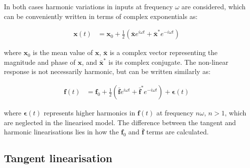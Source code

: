 \documentclass[preprint]{elsarticle}
\begin{document}
In both cases harmonic variations in inputs at frequency $\omega{}$ are considered,
which can be conveniently written in terms of complex exponentials as:
\begin{linenomath}\begin{align}
  \label{eq:139}
  \boldsymbol{x}(t) &= \boldsymbol{x}_0 + \frac{1}{2} \left( \bar{\boldsymbol{x}} e^{i\omega{}t} + \bar{\boldsymbol{x}}^* e^{-i\omega{}t} \right)
\end{align}\end{linenomath}
where $\boldsymbol{x}_0$ is the mean value of $\boldsymbol{x}$, $\bar{\boldsymbol{x}}$ is a complex vector representing
the magnitude and phase of $\boldsymbol{x}$, and $\bar{\boldsymbol{x}}^*$ is its complex conjugate. The
non-linear response is not necessarily harmonic, but can be written similarly
as:
\begin{linenomath}\begin{align}
  \label{eq:140}
  \boldsymbol{f}(t) &= \boldsymbol{f}_0 + \frac{1}{2} \left( \bar{\boldsymbol{f}} e^{i\omega{}t} +
         \bar{\boldsymbol{f}}^* e^{-i\omega{}t} \right) + \boldsymbol{\epsilon}(t)
\end{align}\end{linenomath}
where $\boldsymbol{\epsilon}(t)$ represents higher harmonics in
$\boldsymbol{f}(t)$ at frequency $n\omega{}$, $n > 1$, which are neglected in
the linearised model. The difference between the tangent and harmonic
linearisations lies in how the $\boldsymbol{f}_0$ and $\bar{\boldsymbol{f}}$
terms are calculated.

\subsection{Tangent linearisation}
\label{sec:tangent}
\end{document}
